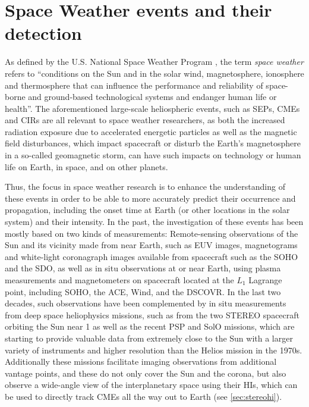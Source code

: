 \section{Space Weather events and their detection}
\label{sec:spaceweather}

As defined by the U.S. National Space Weather Program \parencite{OFCM-1995}, the term \textit{space weather} refers to ``conditions on the Sun and in the solar wind, magnetosphere, ionosphere and thermosphere that can influence the performance and reliability of space-borne and ground-based technological systems and endanger human life or health''.
The aforementioned large-scale heliospheric events, such as \acp{SEP}, \acp{CME} and \acp{CIR} are all relevant to space weather researchers, as both the increased radiation exposure due to accelerated energetic particles as well as the magnetic field disturbances, which impact spacecraft or disturb the Earth's magnetosphere in a so-called geomagnetic storm, can have such impacts on technology or human life on Earth, in space, and on other planets.

Thus, the focus in space weather research is to enhance the understanding of these events in order to be able to more accurately predict their occurrence and propagation, including the onset time at Earth (or other locations in the solar system) and their intensity.
In the past, the investigation of these events has been mostly based on two kinds of measurements: Remote-sensing observations of the Sun and its vicinity made from near Earth, such as \ac{EUV} images, magnetograms and white-light coronagraph images available from spacecraft such as the \ac{SOHO} and the \ac{SDO}, as well as in situ observations at or near Earth, using plasma measurements and magnetometers on spacecraft located at the $L_1$ Lagrange point, including \ac{SOHO}, the \ac{ACE}, Wind, and the \ac{DSCOVR}.
In the last two decades, such observations have been complemented by in situ measurements from deep space heliophysics missions, such as from the two \ac{STEREO} spacecraft orbiting the Sun near \SI{1}{\AU} as well as the recent \ac{PSP} and \ac{SolO} missions, which are starting to provide valuable data from extremely close to the Sun with a larger variety of instruments and higher resolution than the Helios mission in the 1970s. Additionally these missions facilitate imaging observations from additional vantage points, and these do not only cover the Sun and the corona, but also observe a wide-angle view of the interplanetary space using their \acp{HI}, which can be used to directly track \acp{CME} all the way out to Earth (see \autoref{sec:stereohi}).

